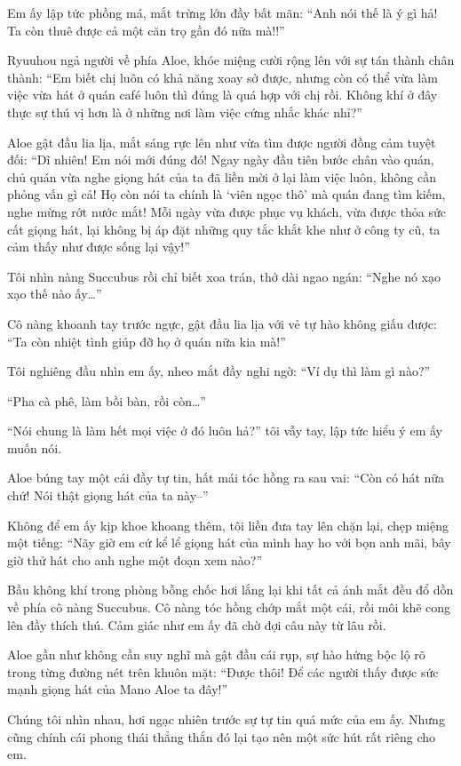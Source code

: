 \documentclass[../main.tex]{subfiles}
\begin{document}
Em ấy lập tức phồng má, mắt trừng lớn đầy bất mãn: ``Anh nói thế là ý gì hả! Ta còn thuê được cả một căn trọ gần đó nữa mà!!''

Ryuuhou ngả người về phía Aloe, khóe miệng cười rộng lên với sự tán thành chân thành: ``Em biết chị luôn có khả năng xoay sở được, nhưng còn có thể vừa làm việc vừa hát ở quán café luôn thì đúng là quá hợp với chị rồi. Không khí ở đây thực sự thú vị hơn là ở những nơi làm việc cứng nhắc khác nhỉ?''

Aloe gật đầu lia lịa, mắt sáng rực lên như vừa tìm được người đồng cảm tuyệt đối: ``Dĩ nhiên! Em nói mới đúng đó! Ngay ngày đầu tiên bước chân vào quán, chủ quán vừa nghe giọng hát của ta đã liền mời ở lại làm việc luôn, không cần phỏng vấn gì cả! Họ còn nói ta chính là `viên ngọc thô' mà quán đang tìm kiếm, nghe mừng rớt nước mắt! Mỗi ngày vừa được phục vụ khách, vừa được thỏa sức cất giọng hát, lại không bị áp đặt những quy tắc khắt khe như ở công ty cũ, ta cảm thấy như được sống lại vậy!''

Tôi nhìn nàng Succubus rồi chỉ biết xoa trán, thở dài ngao ngán: ``Nghe nó xạo xạo thế nào ấy\dots''

Cô nàng khoanh tay trước ngực, gật đầu lia lịa với vẻ tự hào không giấu được: ``Ta còn nhiệt tình giúp đỡ họ ở quán nữa kia mà!''

Tôi nghiêng đầu nhìn em ấy, nheo mắt đầy nghi ngờ: ``Ví dụ thì làm gì nào?''

``Pha cà phê, làm bồi bàn, rồi còn\dots''

``Nói chung là làm hết mọi việc ở đó luôn hả?'' tôi vẫy tay, lập tức hiểu ý em ấy muốn nói.

Aloe búng tay một cái đầy tự tin, hất mái tóc hồng ra sau vai: ``Còn có hát nữa chứ! Nói thật giọng hát của ta này--''

Không để em ấy kịp khoe khoang thêm, tôi liền đưa tay lên chặn lại, chẹp miệng một tiếng: ``Nãy giờ em cứ kể lể giọng hát của mình hay ho với bọn anh mãi, bây giờ thử hát cho anh nghe một đoạn xem nào?''

Bầu không khí trong phòng bỗng chốc hơi lắng lại khi tất cả ánh mắt đều đổ dồn về phía cô nàng Succubus. Cô nàng tóc hồng chớp mắt một cái, rồi môi khẽ cong lên đầy thích thú. Cảm giác như em ấy đã chờ đợi câu này từ lâu rồi.

Aloe gần như không cần suy nghĩ mà gật đầu cái rụp, sự hào hứng bộc lộ rõ trong từng đường nét trên khuôn mặt: ``Được thôi! Để các người thấy được sức mạnh giọng hát của Mano Aloe ta đây!''

Chúng tôi nhìn nhau, hơi ngạc nhiên trước sự tự tin quá mức của em ấy. Nhưng cũng chính cái phong thái thẳng thắn đó lại tạo nên một sức hút rất riêng cho em.
\end{document}
